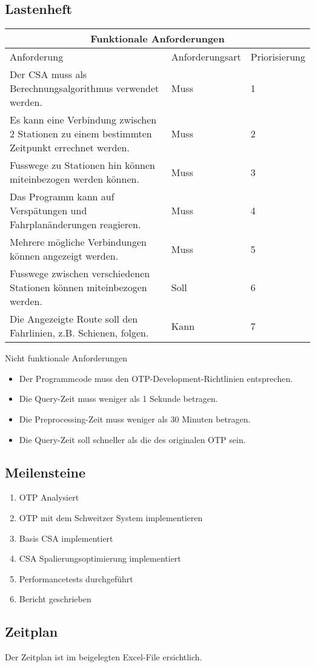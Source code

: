 \subsection{Lastenheft}
\label{Lastenheft}
\begin{tabular}{ | p{5cm} | l | l | }
	\hline
	\multicolumn{3}{|c|}{Funktionale Anforderungen} \\
	\hline
	Anforderung & Anforderungsart & Priorisierung \\
	\hline
	Der CSA muss als Berechnungsalgorithmus verwendet werden. & Muss & 1 \\
	\hline
	Es kann eine Verbindung zwischen 2 Stationen zu einem bestimmten Zeitpunkt errechnet werden. & Muss & 2 \\
	\hline
	Fusswege zu Stationen hin können miteinbezogen werden können. & Muss & 3 \\
	\hline
	Das Programm kann auf Verspätungen und Fahrplanänderungen reagieren. & Muss & 4 \\
	\hline
	Mehrere mögliche Verbindungen können angezeigt werden. & Muss & 5 \\
	\hline
	Fusswege zwischen verschiedenen Stationen können miteinbezogen werden. & Soll & 6 \\
	\hline
	Die Angezeigte Route soll den Fahrlinien, z.B. Schienen, folgen. & Kann & 7 \\
	\hline
\end{tabular}
\newline
\newline
\newline
Nicht funktionale Anforderungen
\begin{itemize}
	\item Der Programmcode muss den OTP-Development-Richtlinien entsprechen.
	\item Die Query-Zeit muss weniger als 1 Sekunde betragen.
	\item Die Preprocessing-Zeit muss weniger als 30 Minuten betragen.
	\item Die Query-Zeit soll schneller als die des originalen OTP sein.
\end{itemize}

\subsection{Meilensteine}
\label{Meilensteine}
\begin{enumerate}
	\item OTP Analysiert
	\item OTP mit dem Schweitzer System implementieren
	\item Basis CSA implementiert
	\item CSA Spalierungsoptimierung implementiert
	\item Performancetests durchgeführt
	\item Bericht geschrieben
\end{enumerate}

\subsection{Zeitplan}
\label{Zeitplan}
Der Zeitplan ist im beigelegten Excel-File ersichtlich.